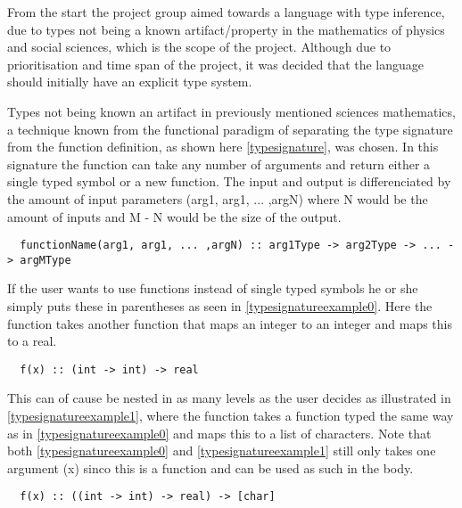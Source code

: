 From the start the project group aimed towards a language with type inference, due to types not being a known artifact/property in the mathematics of physics and social sciences, which is the scope of the project. Although due to prioritisation and time span of the project, it was decided that the language should initially have an explicit type system.

Types not being known an artifact in previously mentioned sciences mathematics, a technique known from the functional paradigm of separating the type signature from the function definition, as shown here \cref{typesignature}, was chosen. In this signature the function can take any number of arguments and return either a single typed symbol or a new function. The input and output is differenciated by the amount of input parameters (arg1, arg1, ... ,argN) where N would be the amount of inputs and M - N would be the size of the output.

\begin{verbatim}
  functionName(arg1, arg1, ... ,argN) :: arg1Type -> arg2Type -> ... -> argMType
\end{verbatim}
\label{typesignature}

If the user wants to use functions instead of single typed symbols he or she simply puts these in parentheses as seen in \cref{typesignatureexample0}. Here the function takes another function that maps an integer to an integer and maps this to a real.

\begin{verbatim}
  f(x) :: (int -> int) -> real
\end{verbatim}
\label{typesignatureexample0}

This can of cause be nested in as many levels as the user decides as illustrated in \cref{typesignatureexample1}, where the function takes a function typed the same way as in \cref{typesignatureexample0} and maps this to a list of characters. Note that both \cref{typesignatureexample0} and \cref{typesignatureexample1} still only takes one argument (x) sinco this is a function and can be used as such in the body.

\begin{verbatim}
  f(x) :: ((int -> int) -> real) -> [char]
\end{verbatim}
\label{typesignatureexample1}

